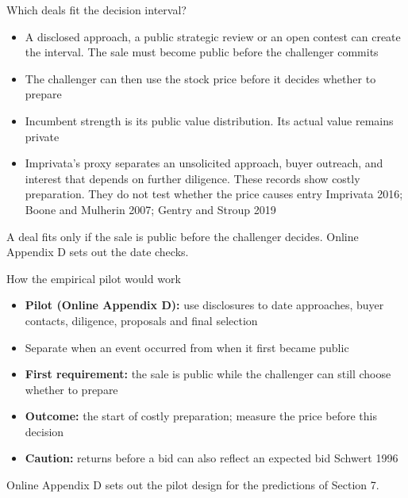 \documentclass[10pt,aspectratio=169]{beamer}
\makeatletter
\newif\iftalk@appendix
\let\talk@AppendixStart\AppendixStart
\renewcommand{\AppendixStart}{\global\talk@appendixtrue\talk@AppendixStart}
\newcommand{\GrayLine}[1]{\par{\color{cGrayText}\footnotesize #1\par}}
\providecommand{\graycite}{}
\renewcommand{\graycite}[1]{{\color{cGrayText}\footnotesize #1}}
\newcommand{\NavGap}{\par\vspace{0.45cm}}%
\let\AdapterBackButton\BackButton
\renewcommand{\BackButton}[1]{\NavGap\AdapterBackButton{#1}}%
\makeatother
\begin{document}
\AppendixStart

\begin{frame}[label=A1]{Which deals fit the decision interval?}
\hypertarget{app:interval}{}
\begin{itemize}\setlength{\itemsep}{6pt}
\item A disclosed approach, a public strategic review or an open contest can create the interval. The sale must become public before the challenger commits
\item The challenger can then use the stock price before it decides whether to prepare
\item Incumbent strength is its public value distribution. Its actual value remains private
\item Imprivata's proxy separates an unsolicited approach, buyer outreach, and interest that depends on further diligence. These records show costly preparation. They do not test whether the price causes entry \graycite{Imprivata 2016; Boone and Mulherin 2007; Gentry and Stroup 2019}
\end{itemize}
\vspace{0.4em}
\GrayLine{A deal fits only if the sale is public before the challenger decides. Online Appendix D sets out the date checks.}
\end{frame}

\begin{frame}[label=A2]{How the empirical pilot would work}
\hypertarget{app:evidence}{}
\begin{itemize}\setlength{\itemsep}{6pt}
\item \textbf{Pilot (Online Appendix D):} use disclosures to date approaches, buyer contacts, diligence, proposals and final selection
\item Separate when an event occurred from when it first became public
\item \textbf{First requirement:} the sale is public while the challenger can still choose whether to prepare
\item \textbf{Outcome:} the start of costly preparation; measure the price before this decision
\item \textbf{Caution:} returns before a bid can also reflect an expected bid \graycite{Schwert 1996}
\end{itemize}
\vspace{0.4em}
\GrayLine{Online Appendix D sets out the pilot design for the predictions of Section 7.}
\end{frame}
\end{document}
